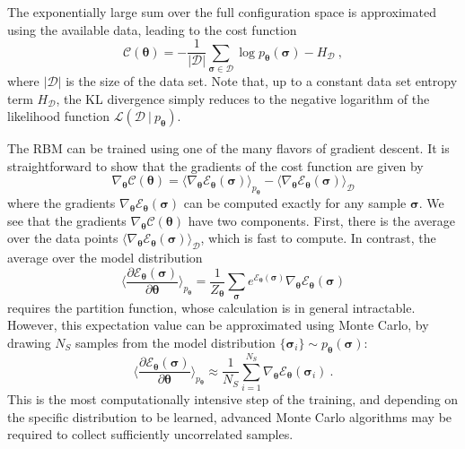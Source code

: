 \documentclass[twocolumn,english,reprint,superscriptaddress,longbibliography,pra]{revtex4-1}
\begin{document}
The exponentially large sum over the full configuration space is approximated using the available data, leading to the cost function
\begin{equation}
\mathcal{C}(\bm{\theta})=
-\frac{1}{|\mathcal{D}|}\sum_{\bm{\sigma}\in\mathcal{D}}\log p_{\bm{\theta}}(\bm{\sigma})-H_{\mathcal{D}}\:,
\label{Eq::KL}
\end{equation}
where $|\mathcal{D}|$ is the size of the data set. Note that, up to a constant data set entropy term $H_{\mathcal{D}}$, the KL divergence simply reduces to the negative logarithm of the likelihood function $\mathcal{L}(\mathcal{D}\:|\:p_{\bm\theta})$.

The RBM can be trained using one of the many flavors of gradient descent. It is straightforward to show that the gradients of the cost function are given by\begin{equation}
\nabla_{\bm\theta}\mathcal{C}({\bm\theta}) = \langle\nabla_{\bm\theta} \mathcal{E}_{\bm\theta}(\bm\sigma)\rangle_{p_{\bm\theta}} -  \langle\nabla_{\bm\theta} \mathcal{E}_{\bm\theta}(\bm\sigma)\rangle_{\mathcal{D}}
\end{equation}
where the gradients $\nabla_{\bm\theta}\mathcal{E}_{\bm\theta}(\bm\sigma)$ can be computed exactly for any sample $\bm{\sigma}$. We see that the gradients $\nabla_{\bm\theta}\mathcal{C}({\bm\theta})$ have two components. First, there is the average over the data points $\langle\nabla_{\bm\theta} \mathcal{E}_{\bm\theta}(\bm\sigma)\rangle_{\mathcal{D}}$, which is fast to compute. In contrast, the average over the model distribution
\begin{equation}
\Big\langle\frac{\partial \mathcal{E}_{\bm\theta}(\bm\sigma)}{\partial \bm\theta}\Big\rangle_{p_{\bm\theta}}=
\frac{1}{Z_{\bm\theta}}\sum_{\bm\sigma}e^{\mathcal{E}_{\bm\theta}(\bm\sigma)}\nabla_{\bm\theta}\mathcal{E}_{\bm\theta}(\bm\sigma)
\end{equation}
requires the partition function, whose calculation is in general intractable. However, this expectation value can be approximated using Monte Carlo, by drawing $N_S$ samples from the model distribution $\{\bm\sigma_i\}\sim p_{\bm\theta}(\bm\sigma)$:
\begin{equation}
\Big\langle\frac{\partial \mathcal{E}_{\bm\theta}(\bm\sigma)}{\partial \bm\theta}\Big\rangle_{p_{\bm\theta}}\approx
\frac{1}{N_S}\sum_{i=1}^{N_S}\nabla_{\bm\theta}\mathcal{E}_{\bm\theta}(\bm\sigma_i)\:.
\end{equation}
This is the most computationally intensive step of the training, and depending on the specific distribution to be learned, advanced Monte Carlo algorithms may be required to collect sufficiently uncorrelated samples.
\end{document}
